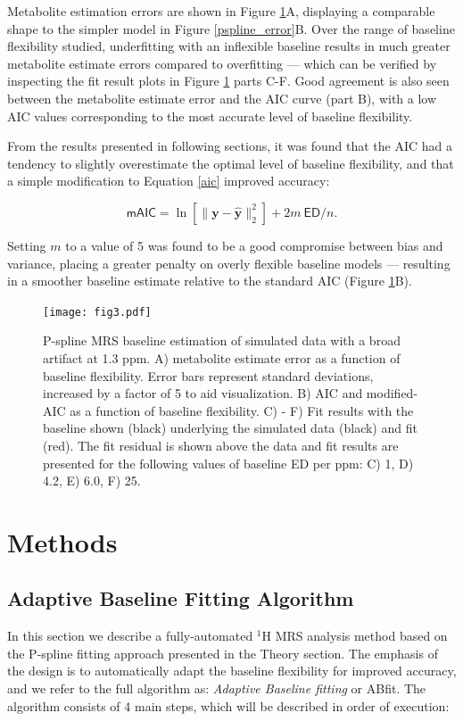 \documentclass[num-refs]{wiley-article}
\begin{document}
Metabolite estimation errors are shown in Figure \ref{mrs_bl_simple}A, displaying a comparable shape to the simpler model in Figure \ref{pspline_error}B. Over the range of baseline flexibility studied, underfitting with an inflexible baseline results in much greater metabolite estimate errors compared to overfitting --- which can be verified by inspecting the fit result plots in Figure \ref{mrs_bl_simple} parts C-F. Good agreement is also seen between the metabolite estimate error and the AIC curve (part B), with a low AIC values corresponding to the most accurate level of baseline flexibility.

From the results presented in following sections, it was found that the AIC had a tendency to slightly overestimate the optimal level of baseline flexibility, and that a simple modification to Equation \ref{aic} improved accuracy:

\begin{equation}
  \textsf{mAIC} = \ln \left[ \|\mathbf{y} - \hat{\mathbf{y}}\|^{2}_{2} \right] + 2 m \ \textsf{ED} / n.
  \label{maic}
\end{equation}

Setting $m$ to a value of 5 was found to be a good compromise between bias and variance, placing a greater penalty on overly flexible baseline models --- resulting in a smoother baseline estimate relative to the standard AIC (Figure \ref{mrs_bl_simple}B).

\begin{figure}
  \begin{center}
    \texttt{[image: fig3.pdf]}
    \caption{P-spline MRS baseline estimation of simulated data with a broad artifact at 1.3 ppm. A) metabolite estimate error as a function of baseline flexibility. Error bars represent standard deviations, increased by a factor of 5 to aid visualization. B) AIC and modified-AIC as a function of baseline flexibility. C) - F) Fit results with the baseline shown (black) underlying the simulated data (black) and fit (red). The fit residual is shown above the data and fit results are presented for the following values of baseline ED per ppm: C) 1, D) 4.2, E) 6.0, F) 25.}
    \label{mrs_bl_simple}
  \end{center}
\end{figure}

\section{Methods}
\subsection{Adaptive Baseline Fitting Algorithm}
In this section we describe a fully-automated $^1\mathrm{H}$ MRS analysis method based on the P-spline fitting approach presented in the Theory section. The emphasis of the design is to automatically adapt the baseline flexibility for improved accuracy, and we refer to the full algorithm as: \textit{Adaptive Baseline fitting} or ABfit. The algorithm consists of 4 main steps, which will be described in order of execution:
\end{document}
